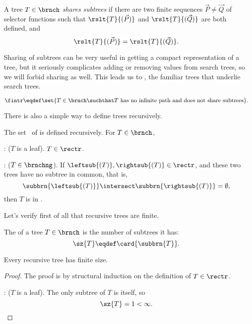 \begin{definition}
\begin{definition}
A tree $T \in \brnch$ \emph{shares subtrees} if there are two finite
sequences $\vec{P} \neq \vec{Q}$ of selector functions such that
$\rslt{T}{(\vec{P})}$ and $\rslt{T}{(\vec{Q})}$ are both defined, and
\[
\rslt{T}{(\vec{P})}=\rslt{T}{(\vec{Q})}.
\]
\end{definition}
Sharing of subtrees can be very useful in getting a compact
representation of a tree, but it seriously complicates adding or
removing values from search trees, so we will forbid sharing as well.
This leads us to \fintr, the familiar trees that underlie search
trees.
\begin{definition}
\[
\fintr \eqdef \set{T \in \brnch \suchthat T\ \text{has no infinite path and
  does not share subtrees}}.
\]
\end{definition}

There is also a simple way to define trees recursively.

\begin{definition}\label{def:rectree}
The set \rectr\ of  is defined recursively.  For
$T \in \brnch$,

: ($T$ is a leaf).  $T \in \rectr$.

: ($T \in \brnchng$).
If $\leftsub{(T)}, \rightsub{(T)} \in \rectr$, and these two trees
have no subtree in common, that is,
\[
\subbrn{\leftsub{(T)}} \intersect \subbrn{\rightsub{(T)}} = \emptyset,
\]
then $T$ is in \rectr.
\end{definition}

Let's verify first of all that recursive trees are finite.
\begin{definition}
The   of a tree $T \in \brnch$ is the
number of subtrees it has:
\begin{equation}\label{treesizedef}
\sz{T} \eqdef \card{\subbrn{T}}.
\end{equation}
\end{definition}

\begin{corollary}\label{cor:finitetree}
Every recursive tree has finite size.

\begin{proof}
The proof is by structural induction on the definition of $T \in
\rectr$.

: ($T$ is a leaf).  The only subtree of $T$
is itself, so
\[
\sz{T} = 1 < \infty.
\]


\end{proof}
\end{corollary}
\end{definition}
